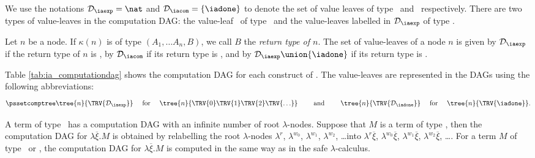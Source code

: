 We use the notations $\mathcal{D}_{\iaexp} = \nat$ and
$\mathcal{D}_{\iacom} = \{ \iadone \}$ to denote the set of value
leaves of type \iaexp\ and \iacom\ respectively. There are two types
of value-leaves in the computation DAG: the value-leaf \iadone\ of
type \iacom\ and the value-leaves labelled in $\mathcal{D}_{\iaexp}$
of type \iaexp.

Let $n$ be a node. If $\kappa(n)$ is of type $(A_1,\ldots A_n,B)$,
we call $B$ the \emph{return type of $n$}. The set of value-leaves
of a node $n$ is given by $\mathcal{D}_{\iaexp}$ if the return type
of $n$ is \iaexp, by $\mathcal{D}_{\iacom}$ if its return type is
\iacom, and by $\mathcal{D}_{\iaexp} \union \{ \iadone \}$ if its
return type is \iavar.


Table \ref{tab:ia_computationdag} shows the computation DAG for each
construct of \ialgol. The value-leaves are represented in the DAGs
using the following abbreviations:
$$ \pssetcomptree\tree{n}{ \TRV{\mathcal{D}_\iaexp} }  \quad \mbox{ for }\quad
 \tree{n}{ \TRV{0} \TRV{1} \TRV{2} \TRV{\ldots} }
 \qquad \mbox{ and } \qquad
 \tree{n}{ \TRV{\mathcal{D}_\iadone} }  \quad \mbox{ for }\quad
 \tree{n}{ \TRV{\iadone }}.
$$

A term of type \iavar\ has a computation DAG with an infinite number
of root $\lambda$-nodes. Suppose that $M$ is a term of type \iavar,
then the computation DAG for $\lambda \overline{\xi} . M$ is
obtained by relabelling the root $\lambda$-nodes $\lambda^r$,
$\lambda^{w_0}$, $\lambda^{w_1}$, $\lambda^{w_2}$, \ldots into
$\lambda^r \overline{\xi}$, $\lambda^{w_0} \overline{\xi}$,
$\lambda^{w_1} \overline{\xi}$, $\lambda^{w_2} \overline{\xi}$,
\ldots. For a term $M$  of type \iaexp\ or \iacom, the computation
DAG for $\lambda \overline{\xi} . M$ is computed in the same way as
in the safe $\lambda$-calculus.

